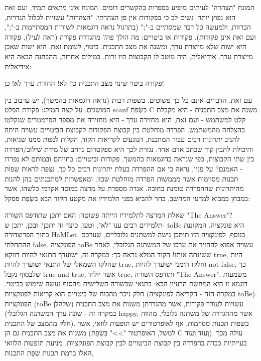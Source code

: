         המונח "הצהרה" לעיתים מופיע בספרות בהקשרים דומים. המונח אינו מתאים תמיד, ועם זאת הוא נפוץ יותר. נשים לב כי בפקודות אין פן הצהרתי. "הצהרות" עשויות לכלול הגדרות, הכרזות, ולמעשה כל דבר שמסתיים ב-";" (בתרגול נראה דוגמאות לשורות המסתיימות ב-";", ועם זאת אינן פקודות).
        פקודות או ביטויים: מה הולך פה?
        מהגדרת פקודה (ראה לעיל), פקודה היא ישות שלא מייצרת ערך, ומשנה את מצב התכנית. ביטוי, לעומת זאת, הוא ישות שאכן מייצרת ערך. אידיאלית, היה מוטב לו הקבוצות היו זרות. במילים אחרות, ההבחנה הבאה היא אידיאלית:

        פקודה
        ביטוי
        שינוי מצב התכנית
        כן!
        לא!
        החזרת ערך
        לא!
        כן!

        עם זאת, הדברים אינם כל כך פשוטים. בשפות רבות (נראה דוגמאות בהמשך), יש ערבוב בין
        המושגים. על קצה המזלג: פקודת הפלט scanf בִּשְׂפַת C משנה את מצב התכנית - היא מקבלת
        קלט למשתמש - ועם זאת, היא מחזירה ערך - היא מחזירה את מספר הפרמטרים שנקלטו
        בהצלחה מהמשתמש. הפרדה מוחלטת בין קבוצת הפקודות לקבוצת הביטויים עשויה היתה
        להניב יתרונות רבים עבור המתכנת, הנוגעים לקריאות הקוד, הקלות לנפות ממנו שגיאות,
        והיכולת להבין קוד שכתב אדם אחר. נגזרת לכך היא ספקטרום נרחב של מידת שילוב/הפרדה
        בין שתי הקבוצות, כפי שנראה בדוגמאות בהמשך. פקודות וביטויים: בחייהם ובמותם לא
        נפרדו - האמנם? על פניו, נראה כי אם ההפרדה בעלת יתרונות רבים כל כך, נצפה לראות
        שפות תכנות מסוימות אשר מממשות הפרדה מוחלטת שכזו, ומאפשרות למתכנתים בהן להנות
        מהיתרונות שההפרדה טומנת בחובה. אגדה מספרת על מרצה במוסד אקדמי כלשהו, אשר במבחן
        במבוא למדעי המחשב, בחר להביא בפני תלמידיו את מקטע הקוד הבא בִּשְׂפַת פסקל:

        שאלת המרצה לתלמידיו הייתה פשוטה: האם יתכן שתודפס השורה "The Answer"? תלמידים
        רבים ענו "לא", וטעו. כיצד זה יתכן? ובכן, יתכן ש- toBe היא פונקציה, המקוננת בתוך
        הפרוצדורה HaMLet. בנוסף, לפונקציה הזו תיתכן גישה למשתנים גלובליים, שערכם
        ההתחלתי false. הפונקציה toBe עשויה אפוא להחזיר את ערכו של המשתנה הגלובלי, לאחר
        ששינתה אותו! הקוד המלא נראה כך: במקרה זה, ישוערך התנאי להיות דווקא true, היות
        שחלקו השמאלי של התנאי ישוערך להיות true, וחלקו הימני ישוערך להיות not false, כך
        שלבסוף נקבל true and true, אשר יוליד true, ותודפס השורה "The Answer".
        משמעות דוגמא זו היא המחשת הרעיון הבא:
        בתנאי שבשורה השלישית מהסוף נעשה שימוש בביטוי. חלק ניכר מהכוח של ביטויים הוא קריאות לפונקציות (במקרה הזה - הקריאה לפונקציה toBe). הפונקציות (toBe שלהלן) עשויות לעורר פקודות, אשר מהגדרתן משנות את מצב התכנית (במקרה זה - שונה ערך המשתנה הגלובלי happy, אשר מההגדרה של משתנה גלובלי, מהווה חלק מהמצב של התכנית). בשפות תכנות מסוימות, אף לאופרטורים יש תופעות לוואי, אשר משנות את מצב התכנית גם הן (למשל, האופרטור ">>" בִּשְׂפַת C וְעוֹד וְעוֹד). עולה מכך בעייתיות כבדה בהפרדה בין קבוצת הביטויים לבין קבוצת הפונקציות. מניעת תופעות הלוואי האלו ברמת תכנות שְׂפַת התכנות,

